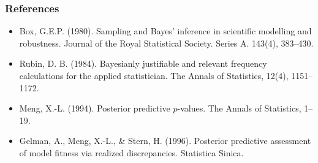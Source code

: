 \subsubsection{References}\label{references}

\begin{itemize}
\item
  Box, G.E.P. (1980). Sampling and Bayes' inference in scientific modelling and
  robustness. Journal of the Royal Statistical Society. Series A. 143(4), 383–430.
\item
  Rubin, D. B. (1984). Bayesianly justifiable and relevant frequency
  calculations for the applied statistician. The Annals of Statistics,
  12(4), 1151–1172.
\item
  Meng, X.-L. (1994). Posterior predictive $p$-values. The Annals of
  Statistics, 1–19.
\item
  Gelman, A., Meng, X.-L., \& Stern, H. (1996). Posterior predictive assessment
  of model fitness via realized discrepancies. Statistica Sinica.
\end{itemize}

